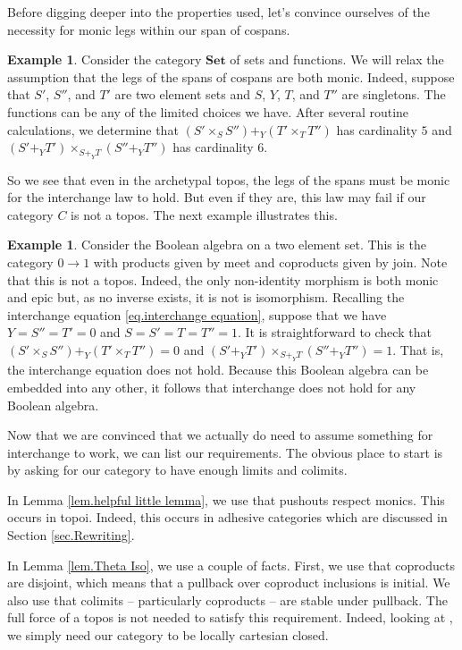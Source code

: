 \documentclass[11pt]{amsart}
\newcommand{\cat}[1]{\mathbf{#1}}
\theoremstyle{remark}
\theoremstyle{definition}
\newtheorem{ex}[thm]{Example}
\begin{document}
Before digging deeper into the properties used, let's convince ourselves of the necessity for monic legs within our span of cospans.

\begin{ex}
	Consider the category $\cat{Set}$ of sets and functions. We will relax the assumption that the legs of the spans of cospans are both monic.  Indeed, suppose that $S'$, $S''$, and $T'$ are two element sets and $S$, $Y$, $T$, and $T''$ are singletons.  The functions can be any of the limited choices we have.  After several routine calculations, we determine that $(S' \times_S S'') +_Y (T' \times_T T'')$ has cardinality $5$ and $(S' +_Y T') \times_{S+_YT} (S''+_YT'')$ has cardinality $6$. 
\end{ex}

So we see that even in the archetypal topos, the legs of the spans must be monic for the interchange law to hold. But even if they are, this law may fail if our category $C$ is not a topos. The next example illustrates this.

\begin{ex}
	Consider the Boolean algebra on a two element set.  This is the category $0 \to 1$ with products given by meet and coproducts given by join. Note that this is not a topos. Indeed, the only non-identity morphism is both monic and epic but, as no inverse exists, it is not is isomorphism. Recalling the interchange equation \eqref{eq.interchange equation}, suppose that we have $Y=S''=T'=0$ and $S=S'=T=T''=1$.  It is straightforward to check that $(S' \times_S S'') +_Y (T' \times_T T'') = 0$ and $(S' +_Y T') \times_{S+_YT} (S''+_YT'')=1$. That is, the interchange equation does not hold.  Because this Boolean algebra can be embedded into any other, it follows that interchange does not hold for any Boolean algebra.
\end{ex}

Now that we are convinced that we actually do need to assume something for interchange to work, we can list our requirements.  The obvious place to start is by asking for our category to have enough limits and colimits.  

In Lemma \ref{lem.helpful little lemma}, we use that pushouts respect monics.  This occurs in topoi. Indeed, this occurs in adhesive categories which are discussed in Section \ref{sec.Rewriting}.  

In Lemma \ref{lem.Theta Iso}, we use a couple of facts.  First, we use that coproducts are disjoint, which means that a pullback over coproduct inclusions is initial. We also use that colimits -- particularly coproducts -- are stable under pullback.  The full force of a topos is not needed to satisfy this requirement.  Indeed, looking at \cite[Thm.~1.4.9]{MacLaneMoerdijk_SheavesGeomLogic}, we simply need our category to be locally cartesian closed.  
\end{document}
